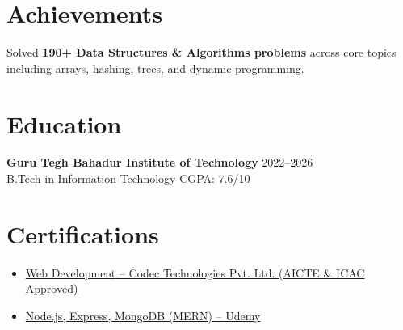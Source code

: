 \documentclass[10pt, a4paper]{article}
\begin{document}
\section*{Achievements}
Solved \textbf{190+ Data Structures \& Algorithms problems} across core topics including arrays, hashing, trees, and dynamic programming.

\section*{Education}
\textbf{Guru Tegh Bahadur Institute of Technology} \hfill 2022--2026 \\
B.Tech in Information Technology \hfill CGPA: 7.6/10 

\section*{Certifications}
\begin{itemize}[leftmargin=*, itemsep=1pt, topsep=1pt]
\item \href{https://drive.google.com/file/d/1KNHM8GmuGeP59YP0wZ3OM3V9Rs1otgR0/view?usp=sharing}
{{Web Development} -- Codec Technologies Pvt. Ltd. (AICTE \& ICAC Approved)}

\item \href{https://drive.google.com/file/d/1Jlx6HSB4emq9N7pFbUYwApuvzpSi00s4/view?usp=sharing}
{Node.js, Express, MongoDB (MERN) -- Udemy}
\end{itemize}
\end{document}
